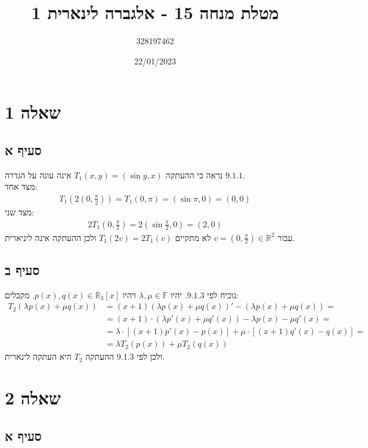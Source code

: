 \documentclass{article}
\title{מטלת מנחה 15 - אלגברה לינארית 1}
\author{328197462}
\date{22/01/2023}
\def\reals{\mathbb{R}}
\def\field{\mathbb{F}}
\begin{document}
\maketitle

\section*{שאלה 1}

\subsection*{סעיף א}

נראה כי ההעתקה $T_1(x,y)=(\sin y, x)$ אינה עונה על הגדרה $9.1.1$. \\
מצד אחד:
\begin{align*}
    T_1(2(0, \frac{\pi}{2}))=T_1(0, \pi)=(\sin \pi, 0) = (0,0)
\end{align*}
מצד שני:
\begin{align*}
    2T_1(0, \frac{\pi}{2})=2(\sin \frac{\pi}{2}, 0) = (2,0)
\end{align*}
עבור $v=(0,\frac{\pi}{2})\in\reals^2$ לא מתקיים $T_1(2v)=2T_1(v)$ ולכן ההעתקה אינה ליניארית.

\subsection*{סעיף ב}

נוכיח לפי $9.1.3$.
יהיו $\lambda, \mu \in \field$ ויהיו $p(x), q(x)\in \reals_3[x]$.
מקבלים:
\begin{align*}
    T_2(\lambda p(x)+\mu q(x)) & = (x+1)(\lambda p(x)+\mu q(x))'-(\lambda p(x)+\mu q(x))=        \\
                               & = (x+1)\cdot (\lambda p'(x)+\mu q'(x))-\lambda p(x)-\mu q'(x) = \\
                               & = \lambda \cdot [(x+1)p'(x)-p(x)]+\mu \cdot [(x+1)q'(x)-q(x)] = \\
                               & = \lambda T_2(p(x))+\mu T_2(q(x))
\end{align*}
ולכן לפי 9.1.3 ההעתקה $T_2$ היא העתקה לינארית.

\pagebreak

\section*{שאלה 2}

\subsection*{סעיף א}
\end{document}
